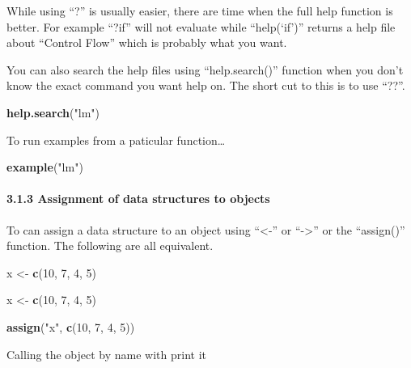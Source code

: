 \documentclass[]{article}
\newenvironment{Shaded}{}{}
\newcommand{\KeywordTok}[1]{\textcolor[rgb]{0.00,0.44,0.13}{\textbf{{#1}}}}
\newcommand{\DecValTok}[1]{\textcolor[rgb]{0.25,0.63,0.44}{{#1}}}
\newcommand{\StringTok}[1]{\textcolor[rgb]{0.25,0.44,0.63}{{#1}}}
\newcommand{\NormalTok}[1]{{#1}}
\begin{document}
While using ``?'' is usually easier, there are time when the full help
function is better. For example ``?if'' will not evaluate while
``help(`if')'' returns a help file about ``Control Flow'' which is
probably what you want.

You can also search the help files using ``help.search()'' function when
you don't know the exact command you want help on. The short cut to this
is to use ``??''.

\begin{Shaded}
\begin{Highlighting}[]
\KeywordTok{help.search}\NormalTok{(}\StringTok{"lm"}\NormalTok{)}
\end{Highlighting}
\end{Shaded}

To run examples from a paticular function\ldots{}

\begin{Shaded}
\begin{Highlighting}[]
\KeywordTok{example}\NormalTok{(}\StringTok{"lm"}\NormalTok{)}
\end{Highlighting}
\end{Shaded}

\paragraph{3.1.3 Assignment of data structures to objects}

To can assign a data structure to an object using ``\textless{}-'' or
``-\textgreater{}'' or the ``assign()'' function. The following are all
equivalent.

\begin{Shaded}
\begin{Highlighting}[]
\NormalTok{x <-}\StringTok{ }\KeywordTok{c}\NormalTok{(}\DecValTok{10}\NormalTok{, }\DecValTok{7}\NormalTok{, }\DecValTok{4}\NormalTok{, }\DecValTok{5}\NormalTok{)}

\NormalTok{x <-}\StringTok{ }\KeywordTok{c}\NormalTok{(}\DecValTok{10}\NormalTok{, }\DecValTok{7}\NormalTok{, }\DecValTok{4}\NormalTok{, }\DecValTok{5}\NormalTok{)}

\KeywordTok{assign}\NormalTok{(}\StringTok{"x"}\NormalTok{, }\KeywordTok{c}\NormalTok{(}\DecValTok{10}\NormalTok{, }\DecValTok{7}\NormalTok{, }\DecValTok{4}\NormalTok{, }\DecValTok{5}\NormalTok{))}
\end{Highlighting}
\end{Shaded}

Calling the object by name with print it
\end{document}
